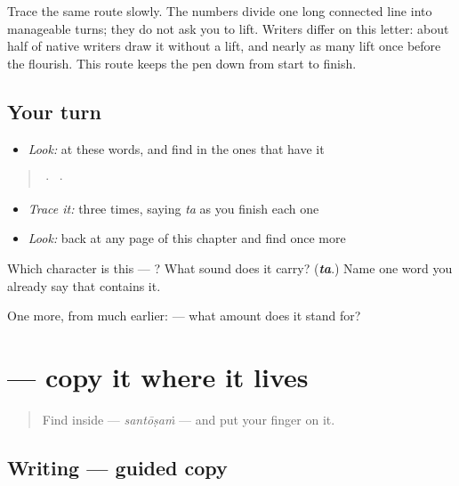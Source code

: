 Trace the same route slowly. The numbers divide one long connected line into manageable turns; they do not ask you to lift. Writers differ on this letter: about half of native writers draw it without a lift, and nearly as many lift once before the flourish. This route keeps the pen down from start to finish.

\subsection*{Your turn}
\begin{itemize}
\raggedright
  \item \emph{Look:} at these words, and find  in the ones that have it
\end{itemize}

\begin{quote}
  ·     ·  
\end{quote}

\begin{itemize}
\raggedright
  \item \emph{Trace it:}  three times, saying \emph{ta} as you finish each one
  \item \emph{Look:} back at any page of this chapter and find  once more
\end{itemize}

\begin{tcolorbox}[breakable,colback=teal!4,colframe=teal!35!black,title={Before you move on}]
Which character is this — ? What sound does it carry? (\emph{\textbf{ta}}.) Name one word you already say that contains it.

One more, from much earlier:  — what amount does it stand for?
\end{tcolorbox}
\section[\texorpdfstring{\te{త} (ta)}{త (ta)}]{ — copy it where it lives}

\label{lesson:TE-S01-copy-in-a-word}



\begin{quote}
Find \textbf{} inside \textbf{} — \emph{santōṣaṁ} — and put your finger on it.
\end{quote}

\subsection*{Writing — guided copy}

